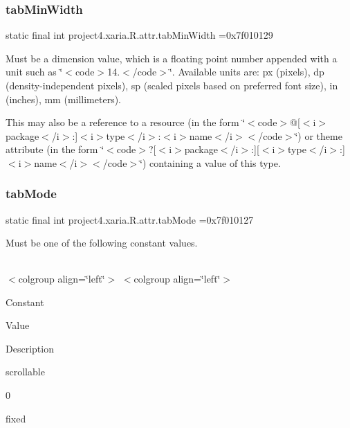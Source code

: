 \subsubsection{\texorpdfstring{tab\+Min\+Width}{tabMinWidth}}
{\footnotesize\ttfamily static final int project4.\+xaria.\+R.\+attr.\+tab\+Min\+Width =0x7f010129\hspace{0.3cm}{\ttfamily [static]}}

Must be a dimension value, which is a floating point number appended with a unit such as \char`\"{}$<$code$>$14.\+5sp$<$/code$>$\char`\"{}. Available units are\+: px (pixels), dp (density-\/independent pixels), sp (scaled pixels based on preferred font size), in (inches), mm (millimeters). 

This may also be a reference to a resource (in the form \char`\"{}$<$code$>$@\mbox{[}$<$i$>$package$<$/i$>$\+:\mbox{]}$<$i$>$type$<$/i$>$\+:$<$i$>$name$<$/i$>$$<$/code$>$\char`\"{}) or theme attribute (in the form \char`\"{}$<$code$>$?\mbox{[}$<$i$>$package$<$/i$>$\+:\mbox{]}\mbox{[}$<$i$>$type$<$/i$>$\+:\mbox{]}$<$i$>$name$<$/i$>$$<$/code$>$\char`\"{}) containing a value of this type. \mbox{\label{classproject4_1_1xaria_1_1R_1_1attr_a6390a15fb6b050569d6a2090f3dd8212}} 
\subsubsection{\texorpdfstring{tab\+Mode}{tabMode}}
{\footnotesize\ttfamily static final int project4.\+xaria.\+R.\+attr.\+tab\+Mode =0x7f010127\hspace{0.3cm}{\ttfamily [static]}}

Must be one of the following constant values.

\tabulinesep=1mm
\begin{longtabu} spread 0pt [c]{*{0}{|X[-1]}|}
\hline
\end{longtabu}
$<$colgroup align=\char`\"{}left\char`\"{}$>$ $<$colgroup align=\char`\"{}left\char`\"{}$>$ 

Constant

Value

Description 

{\ttfamily scrollable}

0

{\ttfamily fixed}

